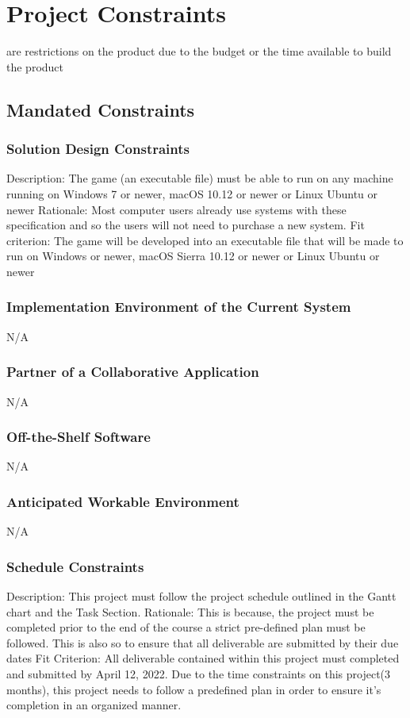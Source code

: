 \documentclass[12pt]{article}
\begin{document}
\section{Project Constraints}
are restrictions on the product due to the budget or the 
time available to build the product
\subsection{Mandated Constraints}
\subsubsection{Solution Design Constraints}
Description: The game (an executable file) must be able to run on any machine running on Windows 7 or newer, macOS 10.12 or newer or Linux Ubuntu or newer
Rationale: Most computer users already use systems with these specification and so the users will not need to purchase a new system.
Fit criterion: The game will be developed into an executable file that will be made to run on Windows or newer, macOS Sierra 10.12 or newer or Linux Ubuntu or newer
\subsubsection{Implementation Environment of the Current System}
N/A
\subsubsection{Partner of a Collaborative Application}
N/A
\subsubsection{Off-the-Shelf Software}
N/A
\subsubsection{Anticipated Workable Environment}
N/A
\subsubsection{Schedule Constraints}
Description: This project must follow the project schedule outlined in the Gantt chart and the Task Section.
Rationale: This is because, the project must be completed prior to the end of the course a strict pre-defined plan must be followed. This is also so to ensure that all deliverable are submitted by their due dates
Fit Criterion: All deliverable contained within this project must completed and submitted by April 12, 2022. 
Due to the time constraints on this project(3 months), this project needs to follow a predefined plan in order to ensure it's completion in an organized manner.
\end{document}
